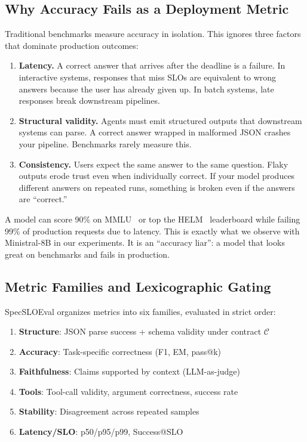 \documentclass[11pt]{article}
\begin{document}
\subsection{Why Accuracy Fails as a Deployment Metric}

Traditional benchmarks measure accuracy in isolation.
This ignores three factors that dominate production outcomes:

\begin{enumerate}[leftmargin=12pt]
    \item \textbf{Latency.} A correct answer that arrives after the deadline is a failure.  In interactive systems, responses that miss SLOs are equivalent to wrong answers because the user has already given up.  In batch systems, late responses break downstream pipelines.

    \item \textbf{Structural validity.} Agents must emit structured outputs that downstream systems can parse.  A correct answer wrapped in malformed JSON crashes your pipeline.  Benchmarks rarely measure this.

    \item \textbf{Consistency.} Users expect the same answer to the same question.  Flaky outputs erode trust even when individually correct.  If your model produces different answers on repeated runs, something is broken even if the answers are ``correct.''
\end{enumerate}

A model can score 90\% on MMLU~\citep{hendrycks2021mmlu} or top the HELM~\citep{liang2023helm} leaderboard while failing 99\% of production requests due to latency.
This is exactly what we observe with Ministral-8B in our experiments.
It is an ``accuracy liar'': a model that looks great on benchmarks and fails in production.

\subsection{Metric Families and Lexicographic Gating}

SpecSLOEval organizes metrics into six families, evaluated in strict order:

\begin{enumerate}[leftmargin=12pt]
    \item \textbf{Structure}: JSON parse success + schema validity under contract $\mathcal{C}$
    \item \textbf{Accuracy}: Task-specific correctness (F1, EM, pass@k)
    \item \textbf{Faithfulness}: Claims supported by context (LLM-as-judge)
    \item \textbf{Tools}: Tool-call validity, argument correctness, success rate
    \item \textbf{Stability}: Disagreement across repeated samples
    \item \textbf{Latency/SLO}: p50/p95/p99, Success@SLO
\end{enumerate}
\end{document}
